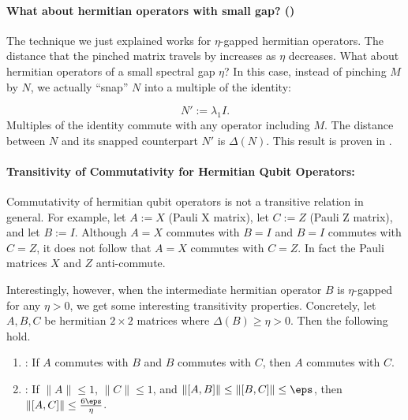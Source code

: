 \paragraph{What about hermitian operators with small gap? ()} The technique we just explained works for $\eta$-gapped hermitian operators. The distance that the pinched matrix travels by increases as $\eta$ decreases. What about hermitian operators of a small spectral gap $\eta$? In this case, instead of pinching $M$ by $N$, we actually ``snap'' $N$ into a multiple of the identity:

\begin{equation}
    N' := \lambda_1 I.
\end{equation}
Multiples of the identity commute with any operator including $M$. The distance between $N$ and its snapped counterpart $N'$ is $\Delta(N)$. This result is proven in .


\paragraph{Transitivity of Commutativity for Hermitian Qubit Operators:}
Commutativity of hermitian qubit operators is not a transitive relation in general. For example, let $A := X$ (Pauli X matrix), let $C:= Z$ (Pauli Z matrix), and let $B := I$. Although $A = X$ commutes with $B = I$ and $B = I$ commutes with $C = Z$, it does not follow that $A = X$ commutes with $C = Z$. In fact the Pauli matrices $X$ and $Z$ anti-commute.

Interestingly, however, when the intermediate hermitian operator $B$ is $\eta$-gapped for any $\eta > 0$, we get some interesting transitivity properties. Concretely, let $A, B, C$ be hermitian $2 \times 2$ matrices where $\Delta(B) \geq \eta > 0$. Then the following hold.
\begin{enumerate}
    \item {}: If $A$ commutes with $B$ and $B$ commutes with $C$, then $A$ commutes with $C$.
    \item {}: If $\|A\| \leq 1$, $\|C\| \leq 1$, and $\|[A,B]\| \leq \| [B, C] \| \leq \eps$, then $\|[A, C]\| \leq \frac{6\eps}{\eta}$.
\end{enumerate}

